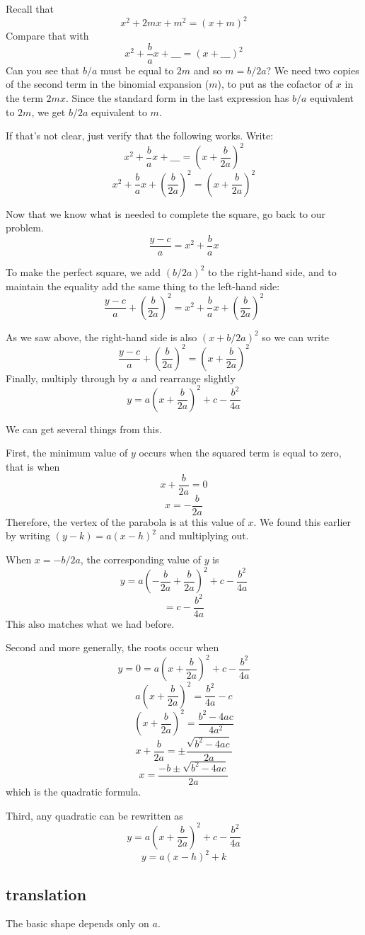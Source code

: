 \documentclass[11pt, oneside]{article}
\begin{document}
Recall that
\[ x^2 + 2mx + m^2 = (x + m)^2 \]
Compare that with 
\[ x^2 + \frac{b}{a} x + \_\_\_ = (x +  \_\_\_)^2 \]
Can you see that $b/a$ must be equal to $2m$ and so $m = b/2a$?  We need two copies of the second term in the binomial expansion ($m$), to put as the cofactor of $x$ in the term $2mx$.  Since the standard form in the last expression has $b/a$ equivalent to $2m$, we get $b/2a$ equivalent to $m$.

If that's not clear, just verify that the following works.  Write:
\[ x^2 + \frac{b}{a} x + \_\_\_ = (x +  \frac{b}{2a})^2 \]
\[ x^2 + \frac{b}{a} x + (\frac{b}{2a})^2 = (x +  \frac{b}{2a})^2 \]

Now that we know what is needed to complete the square, go back to our problem.
\[ \frac{y - c}{a} = x^2 + \frac{b}{a} x \]

To make the perfect square, we add $(b/2a)^2$ to the right-hand side, and to maintain the equality add the same thing to the left-hand side:
\[ \frac{y - c}{a} +  (\frac{b}{2a})^2 = x^2 + \frac{b}{a} x +  (\frac{b}{2a})^2 \]

As we saw above, the right-hand side is also $(x + b/2a)^2$ so we can write
\[ \frac{y - c}{a} +  (\frac{b}{2a})^2 = (x +  \frac{b}{2a})^2 \]
Finally, multiply through by $a$ and rearrange slightly
\[ y = a(x +  \frac{b}{2a})^2 + c - \frac{b^2}{4a}  \]

We can get several things from this.  

First, the minimum value of $y$ occurs when the squared term is equal to zero, that is when
\[ x +  \frac{b}{2a} = 0 \]
\[ x = - \frac{b}{2a} \]
Therefore, the vertex of the parabola is at this value of $x$.  We found this earlier by writing $(y - k) = a(x - h)^2$ and multiplying out.

When $x = -b/2a$, the corresponding value of $y$ is
\[ y = a(-\frac{b}{2a} +  \frac{b}{2a})^2 + c - \frac{b^2}{4a} \]
\[ = c - \frac{b^2}{4a}  \]
This also matches what we had before.
 
Second and more generally, the roots occur when
\[ y = 0 = a(x +  \frac{b}{2a})^2 + c - \frac{b^2}{4a}  \]
\[ a(x + \frac{b}{2a})^2 = \frac{b^2}{4a} - c  \]
\[ (x + \frac{b}{2a})^2 = \frac{b^2-4ac}{4a^2}  \]
\[ x + \frac{b}{2a} = \pm \frac{\sqrt{b^2-4ac}}{2a}  \]
\[ x = \frac{-b \pm \sqrt{b^2-4ac}}{2a}  \]
which is the quadratic formula.

Third, any quadratic can be rewritten as
\[ y = a(x +  \frac{b}{2a})^2 + c - \frac{b^2}{4a}  \]
\[ y = a(x-h)^2 + k \]

\subsection*{translation}
The basic shape depends only on $a$.  
\end{document}
